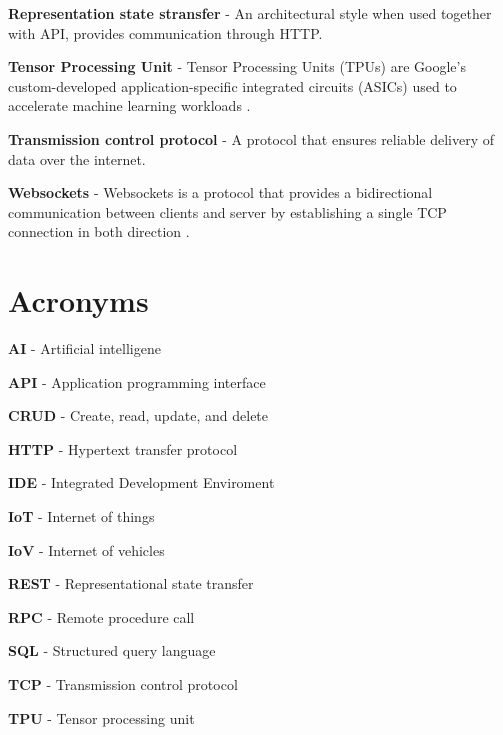 \textbf{Representation state stransfer} - An architectural style when used together with API, provides communication through HTTP.

\textbf{Tensor Processing Unit} - Tensor Processing Units (TPUs) are Google’s custom-developed application-specific integrated circuits (ASICs) used to accelerate machine learning workloads \parencite{google_tpu}.

\textbf{Transmission control protocol} - A protocol that ensures reliable delivery of data over the internet.

\textbf{Websockets} - Websockets is a protocol that provides a bidirectional communication between clients and server by establishing a single TCP connection in both direction \parencite{rfc_websockets}.     

\section{Acronyms}
\textbf{AI} - Artificial intelligene

\textbf{API} - Application programming interface

\textbf{CRUD} - Create, read, update, and delete

\textbf{HTTP} - Hypertext transfer protocol

\textbf{IDE} - Integrated Development Enviroment

\textbf{IoT} - Internet of things

\textbf{IoV} - Internet of vehicles

\textbf{REST} - Representational state transfer

\textbf{RPC} - Remote procedure call 

\textbf{SQL} - Structured query language

\textbf{TCP} - Transmission control protocol

\textbf{TPU} - Tensor processing unit
